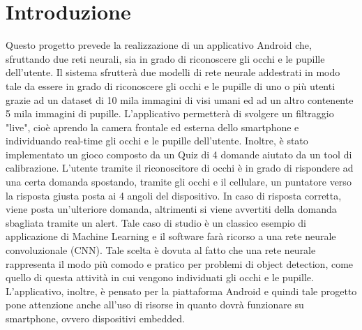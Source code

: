 \documentclass[11pt]{article}
\begin{document}
\clearpage
\null
\thispagestyle{empty}
\clearpage

\newpage







\cleardoublepage



\newpage

\tableofcontents


\newpage


\listoffigures



\newpage


\newpage
\fancyfoot[L]{\thepage}
\setcounter{page}{1}
\section{Introduzione}
Questo progetto prevede la realizzazione di un applicativo Android che, sfruttando due reti neurali, sia in grado di riconoscere gli occhi e le pupille dell'utente. Il sistema sfrutterà due modelli di rete neurale
addestrati in modo tale da essere in grado di riconoscere gli occhi e le pupille di uno o più utenti grazie ad un dataset di 10 mila immagini di visi umani ed ad un altro contenente 5 mila immagini di pupille.
L’applicativo permetterà di svolgere un filtraggio "live", cioè aprendo la camera frontale ed esterna dello smartphone e individuando real-time gli occhi e le pupille dell’utente.
\newline
Inoltre, è stato implementato un gioco composto da un Quiz di 4 domande aiutato da un tool di calibrazione. L'utente tramite il riconoscitore di occhi è in grado di rispondere ad una certa domanda spostando, tramite gli occhi e il cellulare, un puntatore verso la risposta giusta posta ai 4 angoli del dispositivo. In caso di risposta corretta, viene posta un'ulteriore domanda, altrimenti si viene avvertiti della domanda sbagliata tramite un alert.
\newline \newline
Tale caso di studio è un classico esempio di applicazione di Machine Learning e il software farà ricorso a una rete neurale convoluzionale (CNN). Tale scelta è dovuta al fatto che una rete neurale rappresenta il modo più comodo e pratico per problemi di object detection, come quello di questa attività in cui vengono individuati gli occhi e le pupille.
\newline \newline
L’applicativo, inoltre, è pensato per la piattaforma Android e quindi tale progetto pone attenzione anche all’uso di risorse in quanto dovrà funzionare su smartphone, ovvero dispositivi embedded.
\end{document}
